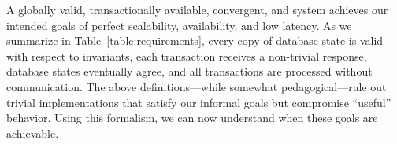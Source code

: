  A globally valid, transactionally available,
convergent, and \cfree system achieves our intended goals of perfect
scalability, availability, and low latency. As we summarize in
Table~\ref{table:requirements}, every copy of database state is valid
with respect to invariants, each transaction receives a non-trivial
response, database states eventually agree, and all transactions are
processed without communication. The above definitions---while
somewhat pedagogical---rule out trivial implementations that satisfy
our informal goals but compromise ``useful'' behavior. Using this
formalism, we can now understand when these goals are achievable.

